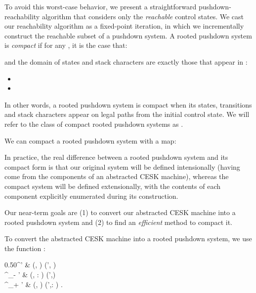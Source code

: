  


To avoid this worst-case behavior, we present a straightforward
pushdown-reachability algorithm that considers only the
\emph{reachable} control states.
We cast our reachability algorithm as a fixed-point iteration, in
which we incrementally construct the reachable subset of a pushdown system.
A rooted pushdown system  is \emph{compact}
if for any , it is the case that:

and the domain of states and stack characters are exactly those that appear in :
\begin{itemize}
\item[]{}
\item[]{}
\end{itemize}
In other words, a rooted pushdown system is compact when its states, transitions and stack characters appear on legal paths from the initial control state.
We will refer to the class of compact rooted pushdown systems as .

We can compact a rooted pushdown system with a map:



In practice, the real difference between a rooted pushdown system and
its compact form is that our original system will be defined
intensionally (having come from the components of an abstracted CESK
machine), whereas the compact system will be defined extensionally,
with the contents of each component explicitly enumerated during its construction.

Our near-term goals are (1) to convert our abstracted CESK machine into
a rooted pushdown system and (2) to find an \emph{efficient} method
to compact it.

To convert the abstracted CESK machine into a rooted pushdown system,
we use the function :

\begin{center}
  {0.50}{\qstate \pdedge^\epsilon \qstate' \in \transfunction &  (\qstate, \acont) \aTo (\qstate', \acont) 
     \acont
     \\
     \qstate \pdedge^{\aphrame_{-}} \qstate'
\in \transfunction &  (\qstate, \aphrame : \acont)
     \aTo (\qstate',\acont)  \acont
     \\
\qstate \pdedge^{\aphrame_{+}} \qstate' \in \transfunction &
      (\qstate, \acont) \aTo (\qstate',\aphrame : \acont)
      \acont
     \text.}
\end{center}


